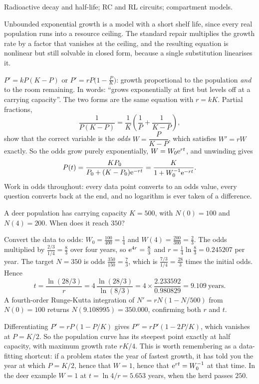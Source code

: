 \begin{seealsob}Radioactive decay and half-life; RC and RL circuits; compartment models.\end{seealsob}

Unbounded exponential growth is a model with a short shelf life, since every real population runs into a resource ceiling. The standard repair multiplies the growth rate by a factor that vanishes at the ceiling, and the resulting equation is nonlinear but still solvable in closed form, because a single substitution linearises it.

\cue $P'=kP(K-P)$ or $P'=rP\bigl(1-\tfrac PK\bigr)$: growth proportional to the population \emph{and} to the room remaining. In words: ``grows exponentially at first but levels off at a carrying capacity''.
\method The two forms are the same equation with $r=kK$. Partial fractions,
\[\frac{1}{P(K-P)}=\frac1K\left(\frac1P+\frac1{K-P}\right),\]
show that the correct variable is the \emph{odds} $W=\dfrac{P}{K-P}$, which satisfies $W'=rW$ exactly. So the odds grow purely exponentially, $W=W_0\mathrm{e}^{rt}$, and unwinding gives
\[P(t)=\frac{KP_0}{P_0+(K-P_0)\mathrm{e}^{-rt}}=\frac{K}{1+W_0^{-1}\mathrm{e}^{-rt}}.\]
Work in odds throughout: every data point converts to an odds value, every question converts back at the end, and no logarithm is ever taken of a difference.

\begin{worked}
A deer population has carrying capacity $K=500$, with $N(0)=100$ and $N(4)=200$. When does it reach $350$?

Convert the data to odds: $W_0=\tfrac{100}{400}=\tfrac14$ and $W(4)=\tfrac{200}{300}=\tfrac23$. The odds multiplied by $\tfrac{2/3}{1/4}=\tfrac83$ over four years, so $\mathrm{e}^{4r}=\tfrac83$ and $r=\tfrac14\ln\tfrac83=0.245207$ per year. The target $N=350$ is odds $\tfrac{350}{150}=\tfrac73$, which is $\tfrac{7/3}{1/4}=\tfrac{28}{3}$ times the initial odds. Hence
\[t=\frac{\ln(28/3)}{r}=4\,\frac{\ln(28/3)}{\ln(8/3)}=4\times\frac{2.233592}{0.980829}=9.109\ \text{years}.\]
A fourth-order Runge-Kutta integration of $N'=rN(1-N/500)$ from $N(0)=100$ returns $N(9.108995)=350.000$, confirming both $r$ and $t$.
\end{worked}

\begin{worked}
Differentiating $P'=rP(1-P/K)$ gives $P''=r P'(1-2P/K)$, which vanishes at $P=K/2$. So the population curve has its steepest point exactly at half capacity, with maximum growth rate $rK/4$. This is worth remembering as a data-fitting shortcut: if a problem states the year of fastest growth, it has told you the year at which $P=K/2$, hence that $W=1$, hence that $\mathrm{e}^{rt}=W_0^{-1}$ at that time. In the deer example $W=1$ at $t=\ln4/r=5.653$ years, when the herd passes $250$.
\end{worked}

